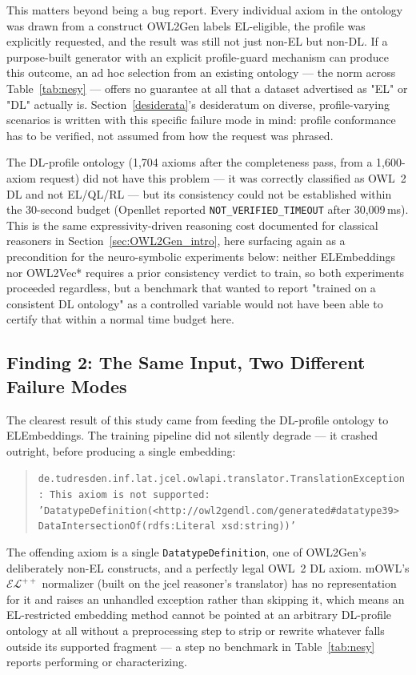 This matters beyond being a bug report. Every individual axiom in the ontology was drawn from a construct OWL2Gen labels EL-eligible, the profile was explicitly requested, and the result was still not just non-EL but non-DL. If a purpose-built generator with an explicit profile-guard mechanism can produce this outcome, an ad hoc selection from an existing ontology — the norm across Table~\ref{tab:nesy} — offers no guarantee at all that a dataset advertised as "EL" or "DL" actually is. Section~\ref{desiderata}'s desideratum on diverse, profile-varying scenarios is written with this specific failure mode in mind: profile conformance has to be verified, not assumed from how the request was phrased.

The DL-profile ontology (1{,}704 axioms after the completeness pass, from a 1{,}600-axiom request) did not have this problem — it was correctly classified as OWL~2 DL and not EL/QL/RL — but its consistency could not be established within the 30-second budget (Openllet reported \texttt{NOT\_VERIFIED\_TIMEOUT} after 30{,}009\,ms). This is the same expressivity-driven reasoning cost documented for classical reasoners in Section~\ref{sec:OWL2Gen_intro}, here surfacing again as a precondition for the neuro-symbolic experiments below: neither ELEmbeddings nor OWL2Vec* requires a prior consistency verdict to train, so both experiments proceeded regardless, but a benchmark that wanted to report "trained on a consistent DL ontology" as a controlled variable would not have been able to certify that within a normal time budget here.

\subsection{Finding 2: The Same Input, Two Different Failure Modes}
\label{sec:study-representation}

The clearest result of this study came from feeding the DL-profile ontology to ELEmbeddings. The training pipeline did not silently degrade — it crashed outright, before producing a single embedding:

\begin{quote}
\texttt{de.tudresden.inf.lat.jcel.owlapi.translator.TranslationException: This axiom is not supported: 'DatatypeDefinition(<http://owl2gendl.com/generated\#datatype39> DataIntersectionOf(rdfs:Literal xsd:string))'}
\end{quote}

The offending axiom is a single \texttt{DatatypeDefinition}, one of OWL2Gen's deliberately non-EL constructs, and a perfectly legal OWL~2 DL axiom. mOWL's $\mathcal{EL}^{++}$ normalizer (built on the jcel reasoner's translator) has no representation for it and raises an unhandled exception rather than skipping it, which means an EL-restricted embedding method cannot be pointed at an arbitrary DL-profile ontology at all without a preprocessing step to strip or rewrite whatever falls outside its supported fragment — a step no benchmark in Table~\ref{tab:nesy} reports performing or characterizing.

